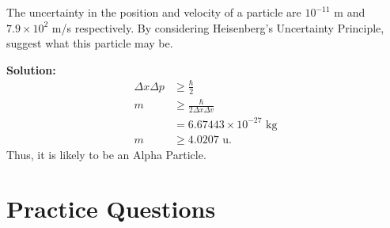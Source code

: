 \documentclass[a4paper, 12pt, addpoints]{exam}
\begin{document}
\begin{questions}

\question The uncertainty in the position and velocity of a particle are $10^{-11}$ m and $7.9 \times 10^2$ m/s respectively. By considering Heisenberg's Uncertainty Principle, suggest what this particle may be.
\begin{tcolorbox}
    \textbf{Solution:}
    \begin{align*}
        \Delta x \Delta p &\geq \frac{\hbar}{2} \\
        m &\geq \frac{\hbar}{2\Delta x \Delta v} \\
        &= 6.67443 \times 10^{-27}\text{ kg} \\
        m &\geq 4.0207\text{ u}.
    \end{align*}
    Thus, it is likely to be an Alpha Particle.
\end{tcolorbox}

\end{questions}
\newpage

\section{Practice Questions}
\end{document}
